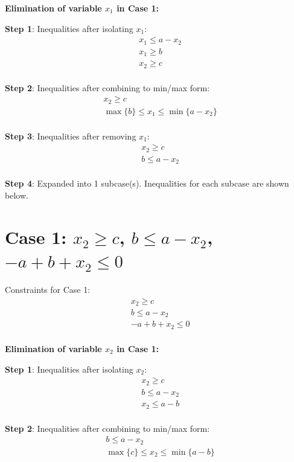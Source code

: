 \documentclass{article}
\begin{document}
\textbf{Elimination of variable $x_{1}$ in Case 1:}

\textbf{Step 1}: Inequalities after isolating $x_{1}$:
\begin{align}
& x_{1} \leq a - x_{2} \\
& x_{1} \geq b \\
& x_{2} \geq c \\
\end{align}

\textbf{Step 2}: Inequalities after combining to min/max form:
\begin{align}
& x_{2} \geq c \\
& \max\{b\} \leq x_{1} \leq \min\{a - x_{2}\} \\
\end{align}

\textbf{Step 3}: Inequalities after removing $x_{1}$:
\begin{align}
& x_{2} \geq c \\
& b \leq a - x_{2} \\
\end{align}

\textbf{Step 4}: Expanded into 1 subcase(s). Inequalities for each subcase are shown below.

\section{Case 1: $x_{2} \geq c$, $b \leq a - x_{2}$, $- a + b + x_{2} \leq 0$}

Constraints for Case 1:
\begin{align}
& x_{2} \geq c \\
& b \leq a - x_{2} \\
& - a + b + x_{2} \leq 0 \\
\end{align}

\textbf{Elimination of variable $x_{2}$ in Case 1:}

\textbf{Step 1}: Inequalities after isolating $x_{2}$:
\begin{align}
& x_{2} \geq c \\
& b \leq a - x_{2} \\
& x_{2} \leq a - b \\
\end{align}

\textbf{Step 2}: Inequalities after combining to min/max form:
\begin{align}
& b \leq a - x_{2} \\
& \max\{c\} \leq x_{2} \leq \min\{a - b\} \\
\end{align}
\end{document}
